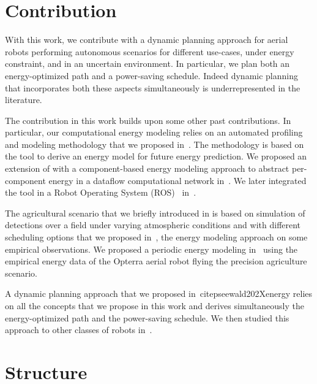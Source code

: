 \section{Contribution}

With this work, we contribute with a dynamic planning approach for aerial robots performing autonomous scenarios for different use-cases, under energy constraint, and in an uncertain environment. In particular, we plan both an energy-optimized path and a power-saving schedule. Indeed dynamic planning that incorporates both these aspects simultaneously is underrepresented in the literature. 

The contribution in this work builds upon some other past contributions. In particular, our computational energy modeling relies on an automated profiling and modeling methodology that we proposed in~\citep{seewald2019coarse}. The methodology is based on the \powprof{} tool to derive an energy model for future energy prediction. We proposed an extension of \powprof{} with a component-based energy modeling approach to abstract per-component energy in a dataflow computational network in~\citep{seewald2019component}. We later integrated the tool in a Robot Operating System (ROS)~\citep{quigley2009ros} in~\citep{zamanakos2020energy}.

The agricultural scenario that we briefly introduced in  is based on simulation of detections over a field under varying atmospheric conditions and with different scheduling options that we proposed in~\citep{zamanakos2020energy}, the energy modeling approach on some empirical observations. We proposed a periodic energy modeling in~\citep{seewald2020mechanical} using the empirical energy data of the Opterra aerial robot flying the precision agriculture scenario. 

A dynamic planning approach that we proposed in~citep{seewald202Xenergy} relies on all the concepts that we propose in this work and derives simultaneously the energy-optimized path and the power-saving schedule. We then studied this approach to other classes of robots in~\citep{seewald2020beyond}.


\section{Structure}
\label{sec:structure}

